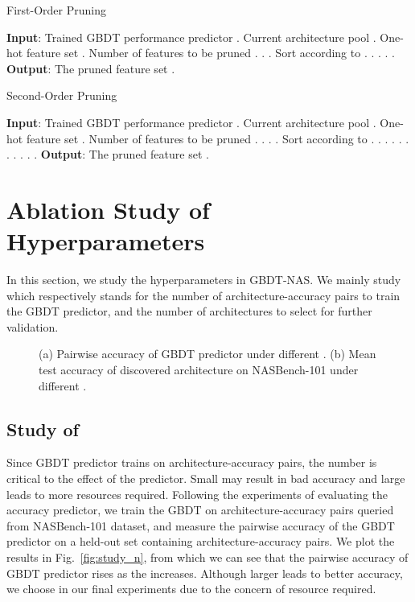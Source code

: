 \documentclass{article}
\begin{document}
\begin{algorithm}[ht]
\small
\caption{First-Order Pruning}
\label{alg:1pruning}
\begin{algorithmic}[1]
\STATE \textbf{Input}: Trained GBDT performance predictor . Current architecture pool . One-hot feature set . Number of features to be pruned .
\STATE .
\STATE .
\STATE Sort  according to .
\FOR {}
\STATE .
\STATE .
\STATE .
\IF{}
\STATE .
\ENDIF
\ENDFOR
\STATE \textbf{Output}: The pruned feature set .
\end{algorithmic}
\end{algorithm}

\begin{algorithm}[ht]
\small
\caption{Second-Order Pruning}
\label{alg:2pruning}
\begin{algorithmic}[1]
\STATE \textbf{Input}: Trained GBDT performance predictor . Current architecture pool . One-hot feature set . Number of features to be pruned .
\STATE .
\STATE .
\STATE .
\STATE Sort  according to .
\FOR {}
\STATE .
\STATE .
\STATE .
\STATE .
\STATE .
\STATE .
\STATE .
\IF{}
\STATE .
\ELSIF{}
\STATE .
\ELSIF{}
\STATE .
\ENDIF
\ENDFOR
\STATE \textbf{Output}: The pruned feature set .
\end{algorithmic}
\end{algorithm}

\section{Ablation Study of Hyperparameters}
In this section, we study the hyperparameters in GBDT-NAS. We mainly study  which respectively stands for the number of architecture-accuracy pairs to train the GBDT predictor, and the number of architectures to select for further validation.

\begin{figure}[htbp]
\centering
{}
\caption{(a) Pairwise accuracy of GBDT predictor under different . (b) Mean test accuracy of discovered architecture on NASBench-101 under different .}
\end{figure}

\subsection{Study of }
Since GBDT predictor trains on  architecture-accuracy pairs, the number  is critical to the effect of the predictor. Small  may result in bad accuracy and large  leads to more resources required. Following the experiments of evaluating the accuracy predictor, we train the GBDT on  architecture-accuracy pairs queried from NASBench-101 dataset, and measure the pairwise accuracy of the GBDT predictor on a held-out set containing  architecture-accuracy pairs. We plot the results in Fig.~\ref{fig:study_n}, from which we can see that the pairwise accuracy of GBDT predictor rises as the  increases. Although larger  leads to better accuracy, we choose  in our final experiments due to the concern of resource required.
\end{document}
